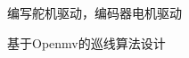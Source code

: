 \documentclass[]{deedy-resume-openfont}
\begin{document}
\begin{minipage}[t]{0.73\textwidth}
\begin{tightemize}
    \item 编写舵机驱动，编码器电机驱动
    \item 基于Openmv的巡线算法设计
    \end{tightemize}
\sectionsep



\end{minipage}
\end{document}
